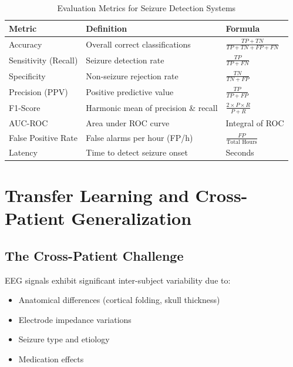 \documentclass[12pt,a4paper]{article}
\begin{document}
\begin{table}[H]
\centering
\caption{Evaluation Metrics for Seizure Detection Systems}
\label{tab:metrics}
\begin{tabular}{lp{6cm}l}
\toprule
\textbf{Metric} & \textbf{Definition} & \textbf{Formula} \\
\midrule
Accuracy & Overall correct classifications & $\frac{TP+TN}{TP+TN+FP+FN}$ \\
Sensitivity (Recall) & Seizure detection rate & $\frac{TP}{TP+FN}$ \\
Specificity & Non-seizure rejection rate & $\frac{TN}{TN+FP}$ \\
Precision (PPV) & Positive predictive value & $\frac{TP}{TP+FP}$ \\
F1-Score & Harmonic mean of precision \& recall & $\frac{2 \times P \times R}{P+R}$ \\
AUC-ROC & Area under ROC curve & Integral of ROC \\
False Positive Rate & False alarms per hour (FP/h) & $\frac{FP}{\text{Total Hours}}$ \\
Latency & Time to detect seizure onset & Seconds \\
\bottomrule
\end{tabular}
\end{table}

\section{Transfer Learning and Cross-Patient Generalization}

\subsection{The Cross-Patient Challenge}

EEG signals exhibit significant inter-subject variability due to:
\begin{itemize}
    \item Anatomical differences (cortical folding, skull thickness)
    \item Electrode impedance variations
    \item Seizure type and etiology
    \item Medication effects
\end{itemize}
\end{document}
